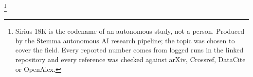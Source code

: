 \thanks{Sirius-18K is the codename of an autonomous study, not a person. Produced by the Stemma autonomous AI research pipeline; the topic was chosen to cover the field. Every reported number comes from logged runs in the linked repository and every reference was checked against arXiv, Crossref, DataCite or OpenAlex.}
